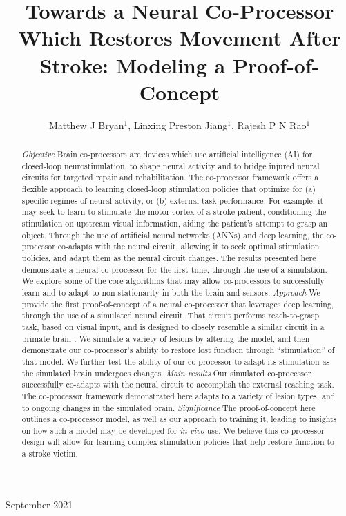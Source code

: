 \documentclass[12pt]{iopart}
\begin{document}
\title[Modeling a Neural Co-Processor]
{Towards a Neural Co-Processor Which Restores Movement After Stroke: Modeling a Proof-of-Concept}

\author{Matthew J Bryan$^{1}$, Linxing Preston Jiang$^{1}$, Rajesh P N Rao$^{1}$}

\address{$^{1}$ Neural Systems Laboratory, Department of Computer
Science and Engineering, University of Washington, Box 352350,
Seattle, WA 98105, USA}

\vspace{10pt}
\begin{indented}
\item[]September 2021
\end{indented}

\begin{abstract}
\textit{Objective} Brain co-processors\cite{rao.coproc} are devices which use artificial
intelligence (AI) for closed-loop neurostimulation, to shape neural activity and to bridge
injured neural circuits for targeted repair and rehabilitation. The co-processor framework
offers a flexible approach to learning closed-loop stimulation policies that optimize for
(a) specific regimes of neural activity, or (b) external task performance.
For example, it may seek to learn to stimulate the motor cortex of a stroke patient,
conditioning the stimulation on upstream visual information, aiding the patient's
attempt to grasp an object. Through the use of artificial neural
networks (ANNs) and deep learning, the co-processor co-adapts with the
neural circuit, allowing it to seek optimal stimulation policies, and adapt them
as the neural circuit changes. The results presented here demonstrate a
neural co-processor for the first time, through the use of a simulation. We
explore some of the core algorithms that may allow co-processors to successfully
learn and to adapt to non-stationarity in both the brain and sensors.
\textit{Approach} We provide the first proof-of-concept of a neural co-processor that
leverages deep learning, through the use of a simulated neural circuit.
That circuit performs reach-to-grasp task, based on visual input, and is designed to
closely resemble a similar circuit in a primate brain \cite{michaels.mrnn}. We simulate
a variety of lesions by altering the model, and then demonstrate our co-processor's ability
to restore lost function through ``stimulation'' of that model. We further test the
ability of our co-processor to adapt its stimulation as the simulated brain undergoes changes.
\textit{Main results} Our simulated co-processor successfully co-adapts with the neural
circuit to accomplish the external reaching task. The co-processor framework
demonstrated here adapts to a variety of lesion types, and to ongoing changes in the
simulated brain.
\textit{Significance} The proof-of-concept here outlines a co-processor model, as well
as our approach to training it, leading to insights on how such a model may be
developed for \textit{in vivo} use. We believe this co-processor design will allow for
learning complex stimulation policies that help restore function to a stroke victim.
\end{abstract}
\end{document}
